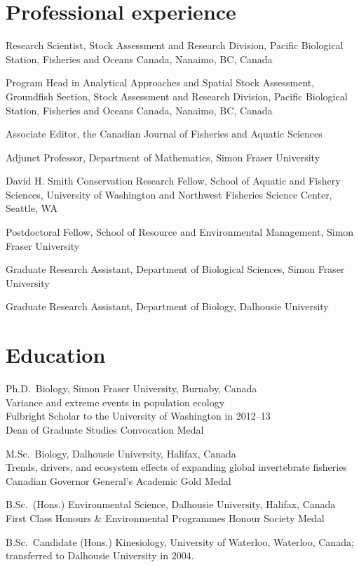 \hypertarget{professional-experience}{%
\section{Professional experience}\label{professional-experience}}

\begin{description}
\tightlist
\item[2021]
Research Scientist, Stock Assessment and Research Division, Pacific
Biological Station, Fisheries and Oceans Canada, Nanaimo, BC, Canada
\item[2017--20]
Program Head in Analytical Approaches and Spatial Stock Assessment,
Groundfish Section, Stock Assessment and Research Division, Pacific
Biological Station, Fisheries and Oceans Canada, Nanaimo, BC, Canada
\item[2019--21]
Associate Editor, the Canadian Journal of Fisheries and Aquatic Sciences
\item[2020--21]
Adjunct Professor, Department of Mathematics, Simon Fraser University
\item[2015--17]
David H. Smith Conservation Research Fellow, School of Aquatic and
Fishery Sciences, University of Washington and Northwest Fisheries
Science Center, Seattle, WA
\item[2015]
Postdoctoral Fellow, School of Resource and Environmental Management,
Simon Fraser University
\item[2011--15]
Graduate Research Assistant, Department of Biological Sciences, Simon
Fraser University
\item[2008--11]
Graduate Research Assistant, Department of Biology, Dalhousie University
\end{description}

\hypertarget{education}{%
\section{Education}\label{education}}

\begin{description}
\tightlist
\item[2011--15]
Ph.D.\ Biology, Simon Fraser University, Burnaby, Canada\\
Variance and extreme events in population ecology\\
Fulbright Scholar to the University of Washington in 2012--13\\
Dean of Graduate Studies Convocation Medal
\item[2008--10]
M.Sc.\ Biology, Dalhousie University, Halifax, Canada\\
Trends, drivers, and ecosystem effects of expanding global invertebrate
fisheries\\
Canadian Governor General's Academic Gold Medal
\item[2004--07]
B.Sc.\ (Hons.) Environmental Science, Dalhousie University, Halifax,
Canada\\
First Class Honours \& Environmental Programmes Honour Society Medal
\item[2001--03]
B.Sc.\ Candidate (Hons.) Kinesiology, University of Waterloo, Waterloo,
Canada; transferred to Dalhousie University in 2004.
\end{description}

